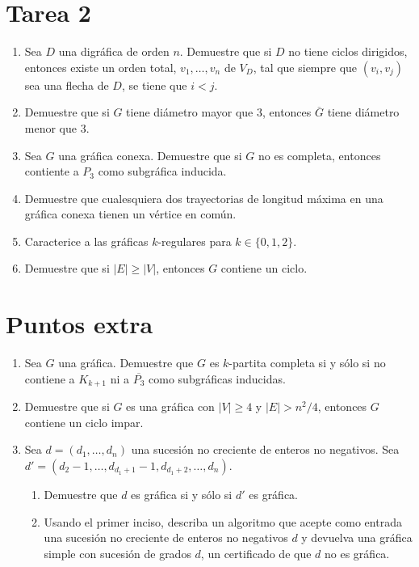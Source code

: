 \documentclass{article}
\begin{document}
\section*{\LARGE{Tarea 2}}


\begin{enumerate}
  \item Sea $D$ una digr\'afica de orden $n$.   Demuestre que si $D$ no tiene
    ciclos dirigidos, entonces existe un orden total, $v_1, \dots, v_n$ de
    $V_D$, tal que siempre que $(v_i, v_j)$ sea una flecha de $D$, se tiene que
    $i < j$.

  \item Demuestre que si $G$ tiene di\'ametro mayor que $3$, entonces
    $\overline{G}$ tiene di\'ametro menor que $3$.

  \item Sea $G$ una gr\'afica conexa.   Demuestre que si $G$ no es completa,
    entonces contiente a $P_3$ como subgr\'afica inducida.

  \item Demuestre que cualesquiera dos trayectorias de longitud m\'axima en una
    gr\'afica conexa tienen un vértice en común.

  \item Caracterice a las gr\'aficas $k$-regulares para $k \in \{ 0, 1, 2 \}$.

  \item Demuestre que si $|E| \ge |V|$, entonces $G$ contiene un ciclo.
\end{enumerate}

\section*{Puntos extra}

\begin{enumerate}
  \item Sea $G$ una gr\'afica.   Demuestre que $G$ es $k$-partita completa si y
    s\'olo si no contiene a $K_{k+1}$ ni a $\overline{P_3}$ como subgr\'aficas
    inducidas.

  \item Demuestre que si $G$ es una gr\'afica con $|V| \ge 4$ y $|E| > n^2/4$,
    entonces $G$ contiene un ciclo impar.

  \item Sea $d = (d_1, \dots, d_n)$ una sucesi\'on no creciente de enteros no
    negativos.   Sea $d' = (d_2-1, \dots, d_{d_1+1}-1, d_{d_1+2}, \dots, d_n)$.
    \begin{enumerate}
      \item Demuestre que $d$ es gr\'afica si y s\'olo si $d'$ es gr\'afica.

      \item Usando el primer inciso, describa un algoritmo que acepte como
        entrada una sucesi\'on no creciente de enteros no negativos $d$ y
        devuelva una gr\'afica simple con sucesi\'on de grados $d$, un
        certificado de que $d$ no es gr\'afica.
    \end{enumerate}
\end{enumerate}
\end{document}
